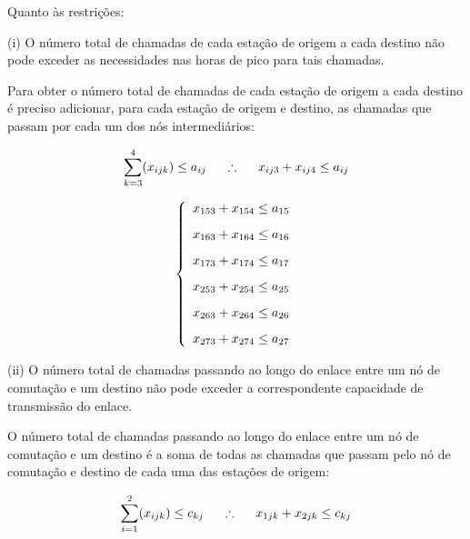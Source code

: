 \documentclass{article}
\begin{document}
Quanto às restrições:

(i)  O número total de chamadas de cada estação de
origem a cada destino não pode exceder as necessidades nas horas de pico para tais chamadas.

Para obter o número total de chamadas de cada estação de
origem a cada destino é preciso adicionar, para cada estação de origem e destino, as chamadas que passam por cada um dos nós intermediários:

\begin{equation*}
    \sum_{k=3}^{4}(x_{ijk}) \leq a_{ij} \hspace{0.5cm} \therefore \hspace{0.5cm} x_{ij3} + x_{ij4} \leq a_{ij}
\end{equation*}

        $$ \left\{
                \begin{array}{l}
                  x_{153} + x_{154} \leq a_{15}  \vspace{0.3cm} \\
                  
                  x_{163} + x_{164} \leq a_{16}  \vspace{0.3cm} \\
                  
                  x_{173} + x_{174} \leq a_{17}  \vspace{0.3cm} \\
                  
                  x_{253} + x_{254} \leq a_{25} \vspace{0.3cm}  \\
                  
                  x_{263} + x_{264} \leq a_{26} \vspace{0.3cm}  \\
                  
                  x_{273} + x_{274} \leq a_{27} 
                \end{array}
              \right. $$

(ii)  O número total de chamadas passando ao longo
do enlace entre um nó de comutação e um destino
não pode exceder a correspondente capacidade de
transmissão do enlace.

O número total de chamadas passando ao longo
do enlace entre um nó de comutação e um destino é a soma de todas as chamadas que passam pelo nó de comutação e destino de cada uma das estações de origem:

\begin{equation*}
    \sum_{i=1}^{2}(x_{ijk}) \leq c_{kj} \hspace{0.5cm} \therefore \hspace{0.5cm} x_{1jk} + x_{2jk} \leq c_{kj}
\end{equation*}
\end{document}
